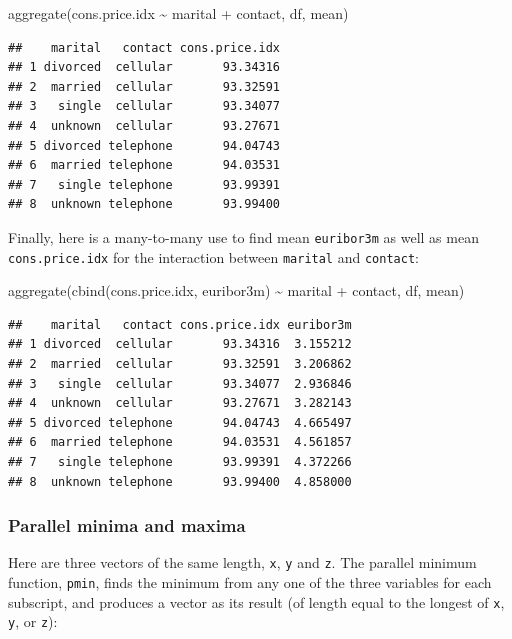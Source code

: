 \documentclass[
]{book}
\newenvironment{Shaded}{\begin{snugshade}}{\end{snugshade}}
\newcommand{\FunctionTok}[1]{\textcolor[rgb]{0.00,0.00,0.00}{#1}}
\newcommand{\NormalTok}[1]{#1}
\newcommand{\SpecialCharTok}[1]{\textcolor[rgb]{0.00,0.00,0.00}{#1}}
\theoremstyle{definition}
\theoremstyle{definition}
\theoremstyle{definition}
\theoremstyle{definition}
\theoremstyle{remark}
\begin{document}
\begin{Shaded}
\begin{Highlighting}[]
\FunctionTok{aggregate}\NormalTok{(cons.price.idx }\SpecialCharTok{\textasciitilde{}}\NormalTok{ marital }\SpecialCharTok{+}\NormalTok{ contact, df, mean)}
\end{Highlighting}
\end{Shaded}

\begin{verbatim}
##    marital   contact cons.price.idx
## 1 divorced  cellular       93.34316
## 2  married  cellular       93.32591
## 3   single  cellular       93.34077
## 4  unknown  cellular       93.27671
## 5 divorced telephone       94.04743
## 6  married telephone       94.03531
## 7   single telephone       93.99391
## 8  unknown telephone       93.99400
\end{verbatim}

Finally, here is a many-to-many use to find mean \texttt{euribor3m} as well as mean \texttt{cons.price.idx} for the interaction between \texttt{marital} and \texttt{contact}:

\begin{Shaded}
\begin{Highlighting}[]
\FunctionTok{aggregate}\NormalTok{(}\FunctionTok{cbind}\NormalTok{(cons.price.idx, euribor3m) }\SpecialCharTok{\textasciitilde{}}\NormalTok{ marital }\SpecialCharTok{+}\NormalTok{ contact, df, mean)}
\end{Highlighting}
\end{Shaded}

\begin{verbatim}
##    marital   contact cons.price.idx euribor3m
## 1 divorced  cellular       93.34316  3.155212
## 2  married  cellular       93.32591  3.206862
## 3   single  cellular       93.34077  2.936846
## 4  unknown  cellular       93.27671  3.282143
## 5 divorced telephone       94.04743  4.665497
## 6  married telephone       94.03531  4.561857
## 7   single telephone       93.99391  4.372266
## 8  unknown telephone       93.99400  4.858000
\end{verbatim}

\hypertarget{parallel-minima-and-maxima}{%
\subsubsection{Parallel minima and maxima}\label{parallel-minima-and-maxima}}

Here are three vectors of the same length, \texttt{x}, \texttt{y} and \texttt{z}. The parallel minimum function, \texttt{pmin}, finds the minimum from any one of the three variables for each subscript, and produces a vector as its result (of length equal to the longest of \texttt{x}, \texttt{y}, or \texttt{z}):
\end{document}
